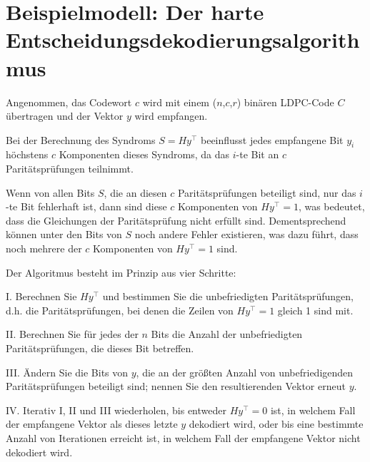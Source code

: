     
    \section{Beispielmodell: Der harte Entscheidungsdekodierungsalgorithmus} 
    
     
    \begin{Beispiel}
    Angenommen, das Codewort $c$ wird mit einem (\(n\),\(c\),\(r\)) binären LDPC-Code $C$ übertragen und der Vektor $y$ wird empfangen.
    
    Bei der Berechnung des Syndroms $S=Hy^\intercal$ beeinflusst jedes empfangene Bit $y_i$ höchstens $c$ Komponenten dieses Syndroms, da das $i$-te Bit an $c$ Paritätsprüfungen teilnimmt.
    
    
    Wenn von allen Bits $S$, die an diesen $c$ Paritätsprüfungen beteiligt sind, nur das $i$-te Bit fehlerhaft ist, dann sind diese $c$ Komponenten von $Hy^\intercal=1$, was bedeutet, dass die Gleichungen der Paritätsprüfung nicht erfüllt sind. Dementsprechend können unter den Bits von $S$ noch andere Fehler existieren, was dazu führt, dass noch mehrere der $c$ Komponenten von $Hy^\intercal=1$ sind.
    \end{Beispiel}
    
    \begin{Theorem}
    Der Algoritmus besteht im Prinzip aus vier Schritte:
    
    I. Berechnen Sie $Hy^\intercal$ und bestimmen Sie die unbefriedigten Paritätsprüfungen, d.h. die Paritätsprüfungen, bei denen die Zeilen von $Hy^\intercal=1$ gleich 1 sind mit.
    
    II. Berechnen Sie für jedes der $n$ Bits die Anzahl der unbefriedigten Paritätsprüfungen, die dieses Bit betreffen.
    
    III. Ändern Sie die Bits von $y$, die an der grö\ss{}ten Anzahl von unbefriedigenden Paritätsprüfungen beteiligt sind; nennen Sie den resultierenden Vektor erneut $y$. 
    
    IV. Iterativ I, II und III wiederholen, bis entweder $Hy^\intercal=0$ ist, 
    in welchem Fall der empfangene Vektor als dieses letzte $y$ dekodiert wird, oder bis eine bestimmte Anzahl von Iterationen erreicht ist, 
    in welchem Fall der empfangene Vektor nicht dekodiert wird.\\
    \end{Theorem}
    
